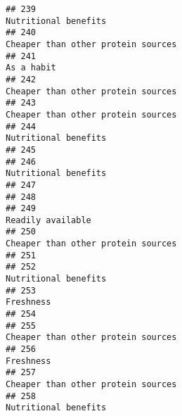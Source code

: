 \documentclass[
]{article}
\begin{document}
\begin{verbatim}
## 239                                                                                                       Nutritional benefits
## 240                                                                                         Cheaper than other protein sources
## 241                                                                                                                 As a habit
## 242                                                                                         Cheaper than other protein sources
## 243                                                                                         Cheaper than other protein sources
## 244                                                                                                       Nutritional benefits
## 245                                                                                                                           
## 246                                                                                                       Nutritional benefits
## 247                                                                                                                           
## 248                                                                                                                           
## 249                                                                                                          Readily available
## 250                                                                                         Cheaper than other protein sources
## 251                                                                                                                           
## 252                                                                                                       Nutritional benefits
## 253                                                                                                                  Freshness
## 254                                                                                                                           
## 255                                                                                         Cheaper than other protein sources
## 256                                                                                                                  Freshness
## 257                                                                                         Cheaper than other protein sources
## 258                                                                                                       Nutritional benefits

\end{verbatim}
\end{document}
